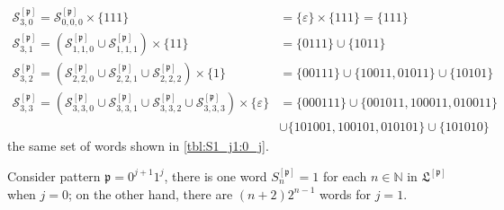 \begin{displaymath}
\begin{split}
    \mathcal{S}_{3, 0}^{[\mathfrak{p}]}=\mathcal{S}_{0, 0, 0}^{[\mathfrak{p}]}\times\lbrace 111 \rbrace &= \lbrace \varepsilon \rbrace\times\lbrace 111 \rbrace= \{111\}\\
    \mathcal{S}_{3, 1}^{[\mathfrak{p}]}={\left(\mathcal{S}_{1, 1, 0}^{[\mathfrak{p}]}\cup\mathcal{S}_{1, 1, 1}^{[\mathfrak{p}]}\right)\times \lbrace 11 \rbrace} &= \{0111\}\cup\{1011\}\\
    \mathcal{S}_{3, 2}^{[\mathfrak{p}]}={\left(\mathcal{S}_{2, 2, 0}^{[\mathfrak{p}]}\cup\mathcal{S}_{2, 2, 1}^{[\mathfrak{p}]}\cup\mathcal{S}_{2, 2, 2}^{[\mathfrak{p}]}\right)\times \lbrace 1 \rbrace} &=\{00111\}\cup\{10011, 01011\}\cup\{10101\}\\
    \mathcal{S}_{3, 3}^{[\mathfrak{p}]}={\left(\mathcal{S}_{3, 3, 0}^{[\mathfrak{p}]}\cup\mathcal{S}_{3, 3, 1}^{[\mathfrak{p}]}\cup\mathcal{S}_{3, 3, 2}^{[\mathfrak{p}]}\cup\mathcal{S}_{3, 3, 3}^{[\mathfrak{p}]}\right)\times \lbrace \varepsilon \rbrace} &= \{000111\}\cup\{001011, 100011, 010011\} \\
            &\cup\{101001, 100101, 010101\}\cup\{101010\}
\end{split}
\end{displaymath}
the same set of words shown in \autoref{tbl:S1_j1:0_j}.

\begin{corollary}
\label{coro:0_j1_1_j}
Consider pattern $\mathfrak{p}=0^{j+1}1^{j}$, there is one word
$S_{n}^{[\mathfrak{p}]} = 1$ for each $n\in\mathbb{N}$ in
$\mathfrak{L}^{[\mathfrak{p}]}$ when $j=0$; on the other hand, there are
$(n+2)2^{n-1}$ words for $j=1$.
\end{corollary}

